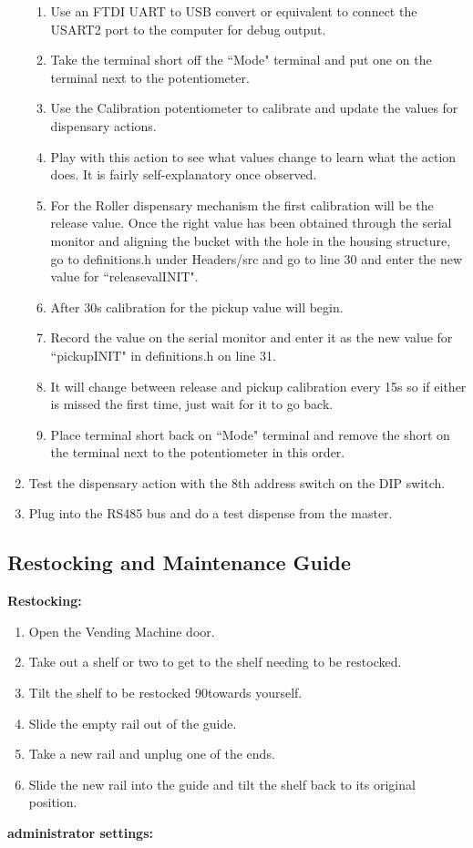 \documentclass[a4paper,11pt]{article}
\numberwithin{figure}{section}
\numberwithin{table}{section}
\begin{document}
\begin{appendices}
\begin{enumerate}
{\begin{enumerate}
  \item Use an FTDI UART to USB convert or equivalent to connect the USART2 port to the computer for debug output.
  \item Take the terminal short off the ``Mode" terminal and put one on the terminal next to the potentiometer.
  \item Use the Calibration potentiometer to calibrate and update the values for dispensary actions. 
  \item Play with this action to see what values change to learn what the action does. It is fairly self-explanatory once observed.
  \item For the Roller dispensary mechanism the first calibration will be the release value. Once the right value has been obtained through the serial monitor and aligning the bucket with the hole in the housing structure, go to definitions.h under Headers/src and go to line 30 and enter the new value for ``releasevalINIT".
  \item After 30s calibration for the pickup value will begin.
  \item Record the value on the serial monitor and enter it as the new value for ``pickupINIT" in definitions.h on line 31.
  \item It will change between release and pickup calibration every 15s so if either is missed the first time, just wait for it to go back.
  \item Place terminal short back on ``Mode" terminal and remove the short on the terminal next to the potentiometer in this order.
  \end{enumerate}}
  \item Test the dispensary action with the 8th address switch on the DIP switch.
  \item Plug into the RS485 bus and do a test dispense from the master.
\end{enumerate}

\subsection{Restocking and Maintenance Guide}
\label{subsec:maintenace}
\textbf{Restocking:}
\begin{enumerate}
\item Open the Vending Machine door.
\item Take out a shelf or two to get to the shelf needing to be restocked.
\item Tilt the shelf to be restocked 90\degree towards yourself.
\item Slide the empty rail out of the guide.
\item Take a new rail and unplug one of the ends.
\item Slide the new rail into the guide and tilt the shelf back to its original position.
\end{enumerate}
\textbf{administrator settings:}


\end{appendices}
\end{document}
